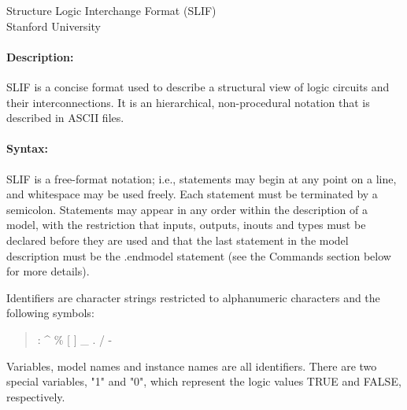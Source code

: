 {\begin{pespace}
\begin{center}
{                  Structure Logic Interchange  Format (SLIF)\\

                            Stanford University\\ }
\end{center}

\paragraph{Description:}
     SLIF is a concise format used to describe a structural view
     of logic circuits and their interconnections.  It is an
     hierarchical, non-procedural notation that is described in
     ASCII files.

\paragraph{Syntax:}
     SLIF is a free-format notation; i.e., statements may begin
     at any point on a line, and whitespace may be used freely.
     Each statement must be terminated by a semicolon. Statements
     may appear in any order within the description of a model,
     with the restriction that inputs, outputs, inouts and types
     must be declared before they are used and that the last
     statement in the model description must be the .endmodel
     statement (see the Commands section below for more details).

     Identifiers are character strings restricted to alphanumeric
     characters and the following symbols:
\begin{quote}
                    : \^{} \% [ ] \_ . / -
\end{quote}
     Variables, model names and instance names are all identifiers.
     There are two special variables, "1" and "0", which
     represent the logic values TRUE and FALSE, respectively.


\end{pespace}}

